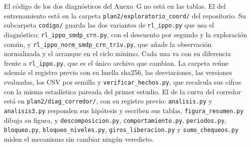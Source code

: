 \begin{sloppypar}
El código de los dos diagnósticos del Anexo~G no está en las tablas.
El del entrenamiento está en la carpeta
\texttt{plan2/exploratorio\_coord/} del repositorio. Su subcarpeta
\texttt{codigo/} guarda las dos variantes de \texttt{rl\_ippo.py} que
usa el diagnóstico: \texttt{rl\_ippo\_smdp\_crn.py}, con el descuento
por segundo y la exploración común, y
\texttt{rl\_ippo\_norm\_smdp\_crn\_triv.py}, que añade la observación
normalizada y el arranque en el ciclo mínimo. Cada una va con su
diferencia frente a \texttt{rl\_ippo.py}, que es el único archivo que
cambian. La carpeta reúne además el registro previo con su huella
sha256, las desviaciones, las versiones evaluadas, los CSV por semilla
y \texttt{verificar\_hechos.py}, que recalcula sus cifras con la misma
estadística pareada del primer estudio. El de la curva del corredor
está en \texttt{plan2/\allowbreak diag\_corredor/}, con su registro
previo: \texttt{analisis.py} y \texttt{analisis3.py} responden sus
hipótesis y escriben sus tablas, \texttt{figura\_resumen.py} dibuja su
figura, y \texttt{descomposicion.py}, \texttt{comportamiento.py},
\texttt{periodos.py}, \texttt{bloqueo.py},
\texttt{bloqueo\_niveles.py}, \texttt{giros\_liberacion.py} y
\texttt{sumo\_chequeos.py} miden el mecanismo sin cambiar ningún
veredicto.
\end{sloppypar}

